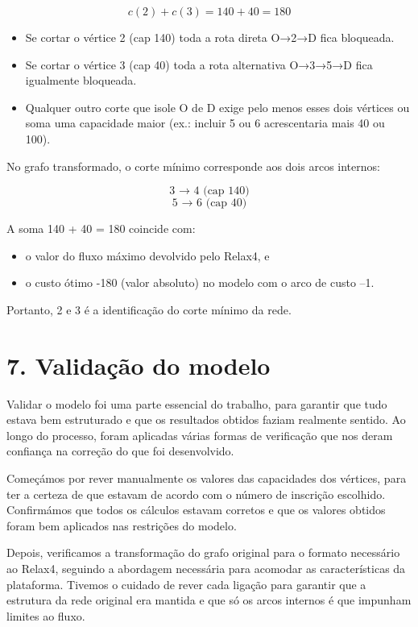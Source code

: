 \documentclass[a4paper,12pt]{article}
\begin{document}
\[
    c(2)+c(3)=140+40=180
\]

\begin{itemize}
    \item Se cortar o vértice 2 (cap 140) toda a rota direta O→2→D fica bloqueada.
    \item Se cortar o vértice 3 (cap 40) toda a rota alternativa O→3→5→D fica igualmente bloqueada.
    \item Qualquer outro corte que isole O de D exige pelo menos esses dois vértices ou soma uma capacidade maior (ex.: incluir 5 ou 6 acrescentaria mais 40 ou 100).
\end{itemize}

No grafo transformado, o corte mínimo corresponde aos dois arcos internos:

\[
    \text{3 → 4   (cap 140)}
\]
\[
\text{5 → 6  (cap  40)}
\]

A soma 140 + 40 = 180 coincide com:

\begin{itemize}
    \item o valor do fluxo máximo devolvido pelo Relax4, e
    \item o custo ótimo -180 (valor absoluto) no modelo com o arco de custo –1.
\end{itemize}

Portanto, { 2 e 3 } é a identificação do corte mínimo da rede.

\section*{7. Validação do modelo}
Validar o modelo foi uma parte essencial do trabalho, para garantir que tudo estava bem estruturado e que os resultados obtidos faziam realmente sentido. Ao longo do processo, foram aplicadas várias formas de verificação que nos deram confiança na correção do que foi desenvolvido.

\vspace{0.5em}

Começámos por rever manualmente os valores das capacidades dos vértices, para ter a certeza de que estavam de acordo com o número de inscrição escolhido. Confirmámos que todos os cálculos estavam corretos e que os valores obtidos foram bem aplicados nas restrições do modelo.

\vspace{0.5em}

Depois, verificamos a transformação do grafo original para o formato necessário ao Relax4, seguindo a abordagem necessária para acomodar as características da plataforma. Tivemos o cuidado de rever cada ligação para garantir que a estrutura da rede original era mantida e que só os arcos internos é que impunham limites ao fluxo.
\end{document}
